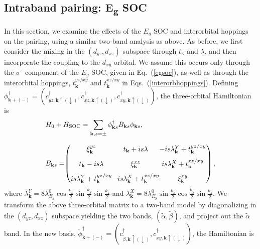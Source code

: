 \documentclass[%
reprint,
superscriptaddress,
 amsmath,amssymb,
 aps,
prb,
nobalancelastpage,
]{revtex4-2}
\begin{document}
\subsection{Intraband pairing: \texorpdfstring{E\textsubscript{g}}{Eg} SOC}
In this section, we examine the effects of the $E_{g}$ SOC and interorbital hoppings on the pairing, using a similar two-band analysis as above. As before, we first consider the mixing in the $(d_{yz},d_{xz})$ subspace through $t_{\textbf{k}}$ and $\lambda$, and then incorporate the coupling to the $d_{xy}$ orbital. We assume this occurs only through the $\sigma^{z}$ component of the $E_{g}$ SOC, given in Eq.~(\ref{egsoc}), as well as through the interorbital hoppings, $t_{\textbf{k}}^{yz/xy}$ and $t_{\textbf{k}}^{xz/xy}$ in Eqs.~(\ref{interorbhoppings}). Defining $\phi_{\textbf{k}+(-)}^{\dagger}=(c_{yz,\textbf{k}\uparrow(\downarrow)}^{\dagger},c_{xz,\textbf{k}\uparrow(\downarrow)}^{\dagger},c_{xy,\textbf{k}\uparrow(\downarrow)}^{\dagger})$, the three-orbital Hamiltonian is 
\begin{equation}
\begin{aligned}
&H_{0}+H_{\text{SOC}}=\sum_{\textbf{k},s=\pm}\phi_{\textbf{k}s}^{\dagger}B_{\textbf{k}s}\phi_{\textbf{k}s},\\[6pt]
&B_{\textbf{k}s} = 
\hspace{-1mm}
\setlength\arraycolsep{0.01mm}
 \begin{pmatrix} 
    \xi_{\textbf{k}}^{yz} & t_{\textbf{k}}+is\lambda & -is\lambda_{\textbf{k}}^{Y} + t_{\textbf{k}}^{yz/xy} \\[7pt]
    t_{\textbf{k}}-is\lambda & \xi_{\textbf{k}}^{xz} &is\lambda_{\textbf{k}}^{X} + t_{\textbf{k}}^{xz/xy} \\[7pt]
     is\lambda_{\textbf{k}}^{Y}+t_{\textbf{k}}^{yz/xy}& -is\lambda_{\textbf{k}}^{X} + t_{\textbf{k}}^{xz/xy} & \xi_{\textbf{k}}^{xy}
\end{pmatrix},
\end{aligned}
\end{equation}
where $\lambda_{\textbf{k}}^{Y} = 8\lambda_{E_{g}}^{0}\cos{\frac{k_x}{2}}\sin{\frac{k_y}{2}}\sin{\frac{k_z}{2}}$ and $\lambda_{\textbf{k}}^{X} = 8\lambda_{E_{g}}^{0}\sin{\frac{k_x}{2}}\cos{\frac{k_y}{2}}\sin{\frac{k_z}{2}}$. We transform the above three-orbital matrix to a two-band model by diagonalizing in the $(d_{yz},d_{xz})$ subspace yielding the two bands, $(\widetilde{\alpha},\widetilde{\beta})$, and project out the $\widetilde{\alpha}$ band. In the new basis, $\widetilde{\phi}_{\textbf{k}+(-)}^{\dagger}=(c_{\widetilde{\beta},\textbf{k}\uparrow(\downarrow)}^{\dagger}, c_{xy,\textbf{k}\uparrow(\downarrow)}^{\dagger})$, the Hamiltonian is
\end{document}
